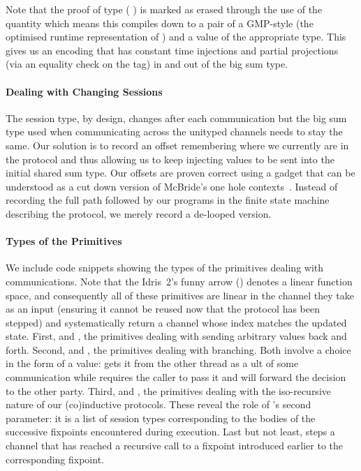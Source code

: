 \documentclass{easychair}
\begin{document}
Note that the proof of type
(   )
is marked as erased through the use of the 
quantity which means this compiles down to a pair of a
GMP-style  (the optimised runtime representation of )
and a value of the appropriate type.
%
This gives us an encoding that has constant time injections
and partial projections (via an equality check on the  tag)
in and out of the big sum type.

\paragraph{Dealing with Changing Sessions}
The session type, by design, changes after each communication
but the big sum type used when communicating across the
unityped channels needs to stay the same.
%
Our solution is to record an offset remembering where we currently
are in the protocol and thus allowing us to keep injecting values to
be sent into the initial shared sum type.
%
Our offsets are proven correct using a gadget that can be understood
as a cut down version of McBride's one hole
contexts~\cite{DBLP:conf/popl/McBride08}. Instead
of recording the full path followed by our programs in the finite
state machine describing the protocol,
we merely record a de-looped version.

\paragraph{Types of the Primitives} We include code snippets showing the
types of the primitives dealing with communications. Note that the Idris~2's
funny arrow () denotes a linear function space, and
consequently all of these primitives are linear in the channel
they take as an input (ensuring it cannot be
reused now that the protocol has been stepped) and systematically return
a channel whose index matches the updated state.
%
First,  and , the primitives
dealing with sending arbitrary values back and forth.
%
Second,  and , the primitives
dealing with branching.
%
Both involve a choice in the form of a  value:
 gets it from the other thread as a ult
of some communication while  requires the caller to
pass it and will forward the decision to the other party.
%
%
Third,  and , the
primitives dealing with the iso-recursive nature of our
(co)inductive protocols. These reveal the role of 's
second parameter: it is a list of session types corresponding to the bodies
of the successive fixpoints encountered during execution.
%
Last but not least,  steps a channel that has
reached a recursive call to a fixpoint introduced earlier to
the corresponding fixpoint.
\end{document}
